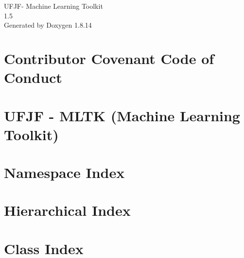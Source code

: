 \documentclass[twoside]{book}
\newcommand{\+}{\discretionary{\mbox{\scriptsize$\hookleftarrow$}}{}{}}
\newcommand{\clearemptydoublepage}{%
  \newpage{\pagestyle{empty}\cleardoublepage}%
}
\begin{document}
\hypersetup{pageanchor=false,
             bookmarksnumbered=true,
             pdfencoding=unicode
            }
\begin{titlepage}
\vspace*{7cm}
\begin{center}%
{\Large U\+F\+J\+F-\/ Machine Learning Toolkit \\[1ex]\large 1.\+5 }\\
\vspace*{1cm}
{\large Generated by Doxygen 1.8.14}\\
\end{center}
\end{titlepage}
\clearemptydoublepage
{}
\tableofcontents
\clearemptydoublepage
{}
\hypersetup{pageanchor=true}

\chapter{Contributor Covenant Code of Conduct}
\label{md__c_1__users__mateus__coutinho__mari__documents__git_hub__machine-_learning-_toolkit__c_o_d_e__o_f__c_o_n_d_u_c_t}

\chapter{U\+F\+JF -\/ M\+L\+TK (Machine Learning Toolkit)}
\label{md__c_1__users__mateus__coutinho__mari__documents__git_hub__machine-_learning-_toolkit__r_e_a_d_m_e}

\chapter{Namespace Index}

\chapter{Hierarchical Index}

\chapter{Class Index}

\end{document}

